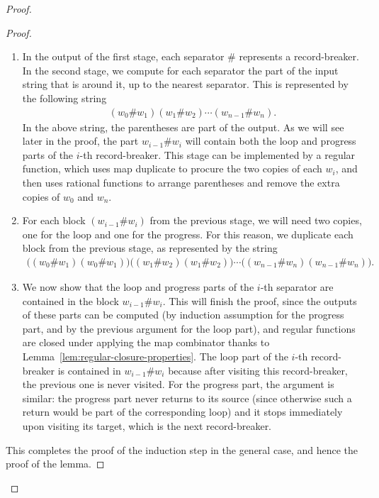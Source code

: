 \begin{proof}
\begin{proof}
\begin{enumerate}
        \item         In the output of the first stage, each separator $\#$ represents a record-breaker. In the second stage, we compute for each separator the part of the input string that is around it, up to the nearest separator. This is represented by  the following string
        \begin{align*}
        (w_0 \# w_1)  (w_1 \# w_2) \cdots (w_{n-1} \# w_n).
        \end{align*}
        In the above string, the parentheses are part of the output.  As we will see later in the proof, the part $w_{i-1}\# w_i$ will contain both the loop and progress parts of the $i$-th record-breaker. This stage can be implemented by a regular function, which uses map duplicate to procure the two copies of each $w_i$, and then uses rational functions to arrange parentheses and remove the extra copies of $w_0$ and $w_n$.  
        \item 
        For each block $(w_{i-1}\# w_i)$ from the previous stage, we will need two copies, one for the loop and one for the progress. For this reason, we duplicate each block from the previous stage, as represented by the string 
             \begin{align*}
        \big((w_0 \# w_1) (w_0 \# w_1)\big)  \big((w_1 \# w_2) (w_1 \# w_2)\big) \cdots \big((w_{n-1} \# w_n) (w_{n-1} \# w_n)\big).
        \end{align*}
        \item We now show that  the loop and progress parts of the $i$-th separator are contained in the block $w_{i-1}\# w_i$. This will finish the proof, since the outputs of these parts can be computed (by induction assumption for the progress part, and by the previous argument for the loop part), and regular functions are closed under applying the map combinator thanks to Lemma~\ref{lem:regular-closure-properties}.  The loop part of the $i$-th record-breaker is contained in $w_{i-1} \# w_i$ because after visiting this record-breaker, the previous one is never visited. For the progress part, the argument is similar: the progress part never returns to its source (since otherwise such a return would be part of the corresponding loop) and it stops immediately upon visiting its target, which is the next record-breaker.
        \end{enumerate}
        This completes the proof of the induction step in the general case, and hence the proof of the lemma.
\end{proof}
\end{proof}


